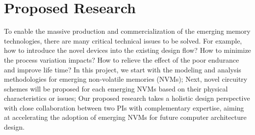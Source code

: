 \section{Proposed Research}
To enable the massive production and commercialization of the emerging memory technologies, there are many critical technical issues to be solved. For example, how to introduce the novel devices into the existing design flow? How to minimize the process variation impacts? How to relieve the effect of the poor endurance and improve life time? In this project, we start with the modeling and analysis methodologies for emerging non-volatile memories (NVMs); Next, novel circuitry schemes will be proposed for each emerging NVMs based on their physical characteristics or issues; %
Our proposed research takes a holistic design perspective with close collaboration between two PIs with complementary expertise, aiming at accelerating the adoption of emerging NVMs for future computer architecture design.



%


